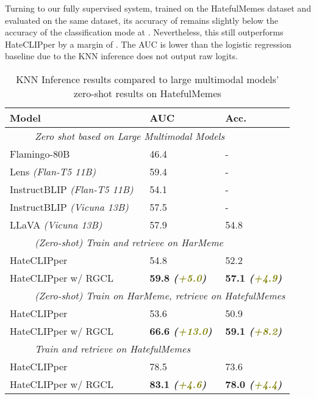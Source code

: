 \documentclass[11pt]{article}
\begin{document}
Turning to our fully supervised system, trained on the HatefulMemes dataset and evaluated on the same dataset, its accuracy of  remains slightly below the accuracy of the classification mode at . Nevertheless, this still outperforms HateCLIPper by a margin of  . The AUC is lower than the logistic regression baseline due to the KNN inference does not output raw logits. 
\begin{table}[]
\small
\caption{KNN Inference results compared to large multimodal models' zero-shot results on HatefulMemes}
\label{tab:results_retrieval}
\centering
\begin{tabularx}{0.495\textwidth}{Xll}
\toprule


 Model                & \textbf{AUC} & \textbf{Acc}. \\ 
\midrule
\multicolumn{3}{l}{\textit{~~~~~Zero shot based on Large Multimodal Models}}                             \\ \midrule
{Flamingo-80B} & 46.4 & - \\
{Lens \textit{(Flan-T5 11B)}}  & 59.4 & - \\
{InstructBLIP \textit{(Flan-T5 11B)}}  & 54.1 & - \\
{InstructBLIP \textit{(Vicuna 13B)}}  & 57.5 & -  \\ 
{LLaVA \textit{(Vicuna 13B)}}  & 57.9 & 54.8 \\
\midrule

\multicolumn{3}{l}{\textit{~~~~~(Zero-shot) Train and retrieve on HarMeme }}                             \\ \midrule
HateCLIPper &  54.8 & 52.2 \\
HateCLIPper w/ RGCL &  \textbf{59.8 \textit{(\textcolor{olive}{+5.0})}} & \textbf{57.1 \textit{(\textcolor{olive}{+4.9})}} \\
\midrule
\multicolumn{3}{l}{\textit{~~~~~(Zero-shot) Train on HarMeme, retrieve on HatefulMemes}}                             \\ \midrule
HateCLIPper &  53.6 & 50.9 \\
HateCLIPper w/ RGCL &   \textbf{66.6 \textit{(\textcolor{olive}{+13.0})}} & \textbf{59.1 \textit{(\textcolor{olive}{+8.2})}} \\


\midrule
\multicolumn{3}{l}{\textit{~~~~~Train and retrieve on HatefulMemes}}                             \\ \midrule


HateCLIPper &  78.5 & 73.6  \\
HateCLIPper w/ RGCL &  \textbf{83.1 \textit{(\textcolor{olive}{+4.6})}} & \textbf{78.0 \textit{(\textcolor{olive}{+4.4})}}  \\


\bottomrule
\end{tabularx}
\end{table}
\end{document}

